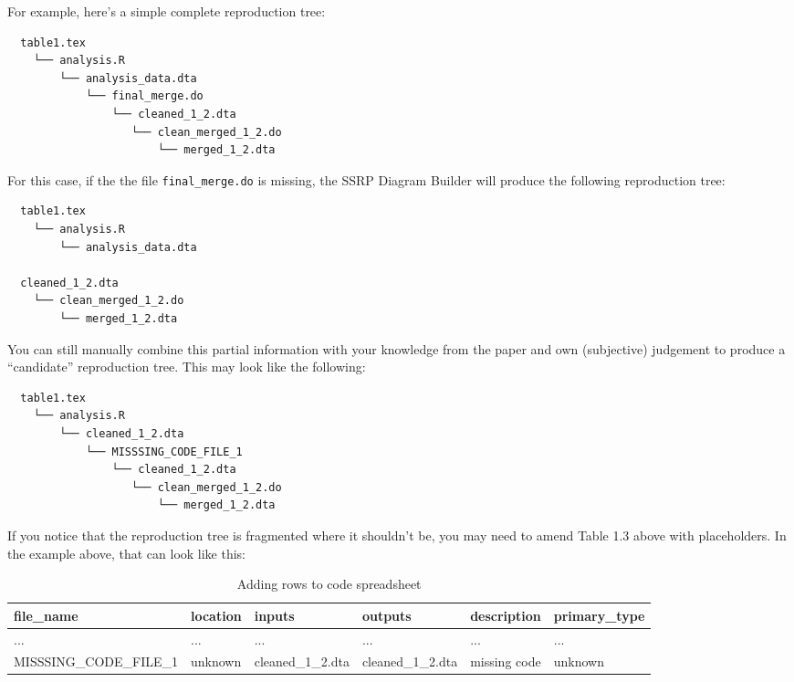 \documentclass[
]{book}
\begin{document}
For example, here's a simple complete reproduction tree:

\begin{verbatim}
  table1.tex
    └── analysis.R
        └── analysis_data.dta
            └── final_merge.do
                └── cleaned_1_2.dta
                   └── clean_merged_1_2.do
                       └── merged_1_2.dta
\end{verbatim}

For this case, if the the file \texttt{final\_merge.do} is missing, the SSRP Diagram Builder will produce the following reproduction tree:

\begin{verbatim}
  table1.tex
    └── analysis.R
        └── analysis_data.dta

  cleaned_1_2.dta
    └── clean_merged_1_2.do
        └── merged_1_2.dta
\end{verbatim}

You can still manually combine this partial information with your knowledge from the paper and own (subjective) judgement to produce a ``candidate'' reproduction tree. This may look like the following:

\begin{verbatim}
  table1.tex
    └── analysis.R
        └── cleaned_1_2.dta
            └── MISSSING_CODE_FILE_1
                └── cleaned_1_2.dta
                   └── clean_merged_1_2.do
                       └── merged_1_2.dta
\end{verbatim}

If you notice that the reproduction tree is fragmented where it shouldn't be, you may need to amend Table 1.3 above with placeholders. In the example above, that can look like this:

\begin{table}

\caption{\label{tab:adding-rows}Adding rows to code spreadsheet}
\centering
\begin{tabu} to 
\hline
file\_name & location & inputs & outputs & description & primary\_type\\
\hline
... & ... & ... & ... & ... & ...\\
\hline
MISSSING\_CODE\_FILE\_1 & unknown & cleaned\_1\_2.dta & cleaned\_1\_2.dta & missing code & unknown\\
\hline
\end{tabu}
\end{table}
\end{document}
